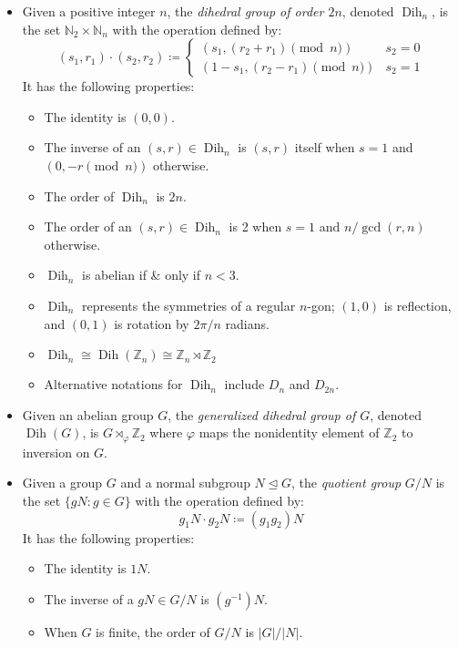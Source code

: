 \documentclass{article}
\newcommand{\N}{\mathbb{N}}
\newcommand{\Z}{\mathbb{Z}}
\DeclareMathOperator{\Dih}{Dih}
\newcommand{\normaleq}{\trianglelefteq}
\begin{document}
\begin{itemize}
\item Given a positive integer $n$, the \emph{dihedral group of order $2n$}, denoted $\Dih_n$, is the set $\N_2\times\N_n$ with the operation defined by: $$(s_1, r_1)\cdot(s_2, r_2)\coloneqq \begin{cases}(s_1, (r_2 + r_1)\pmod{n}) & s_2 = 0 \\ (1-s_1, (r_2 - r_1)\pmod{n}) & s_2 = 1\end{cases}$$  It has the following properties:
 \begin{itemize}
 \item The identity is $(0,0)$.
 \item The inverse of an $(s,r)\in\Dih_n$ is $(s,r)$ itself when $s=1$ and $(0, -r\pmod{n})$ otherwise.
 \item The order of $\Dih_n$ is $2n$.
 \item The order of an $(s,r)\in\Dih_n$ is 2 when $s=1$ and $n/\gcd(r,n)$ otherwise.
 \item $\Dih_n$ is abelian if \& only if $n<3$.
 \item $\Dih_n$ represents the symmetries of a regular $n$-gon; $(1,0)$ is reflection, and $(0,1)$ is rotation by $2\pi/n$ radians.
 \item $\Dih_n \cong \Dih(\Z_n) \cong \Z_n\rtimes\Z_2$
 \item Alternative notations for $\Dih_n$ include $D_n$ and $D_{2n}$.
 \end{itemize}
\item Given an abelian group $G$, the \emph{generalized dihedral group of $G$}, denoted $\Dih(G)$, is $G\rtimes_\varphi\Z_2$ where $\varphi$ maps the nonidentity element of $\Z_2$ to inversion on $G$.

\item Given a group $G$ and a normal subgroup $N\normaleq G$, the \emph{quotient group} $G/N$ is the set $\{gN : g\in G\}$ with the operation defined by: $$g_1N \cdot g_2N \coloneqq (g_1g_2)N$$  It has the following properties:
 \begin{itemize}
 \item The identity is $1N$.
 \item The inverse of a $gN\in G/N$ is $(g^{-1})N$.
 \item When $G$ is finite, the order of $G/N$ is $|G|/|N|$.
 \end{itemize}


\end{itemize}
\end{document}
